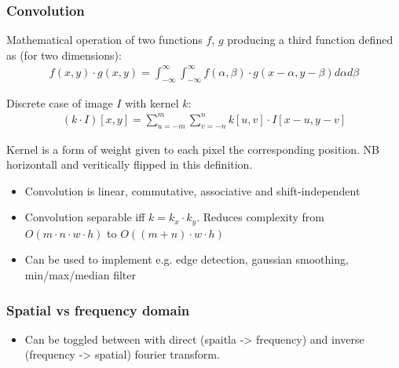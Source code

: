 \subsubsection{Convolution}

Mathematical operation of two functions $f$, $g$ producing a third function
defined as (for two dimensions):
\begin{align*}
		f(x, y) \cdot g(x, y) = \int_{- \infty}^{\infty} \int_{-
		\infty}^{\infty} f(\alpha, \beta) \cdot g(x - \alpha, y - \beta)
		d\alpha d\beta
\end{align*}

Discrete case of image $I$ with kernel $k$:
\begin{align*}
		(k \cdot I)[x, y] = \sum_{u = -m}^{m} \sum_{v = -n}^n k[u, v] \cdot I[x
		- u, y - v]
\end{align*}

Kernel is a form of weight given to each pixel the corresponding position. NB
horizontall and veritically flipped in this definition.

\begin{itemize}
		\item Convolution is linear, commutative, associative and shift-independent
		\item Convolution separable iff $k = k_x \cdot k_y$. Reduces complexity
				from $O(m \cdot n \cdot w \cdot h)$ to $O((m + n) \cdot w \cdot
				h)$

		\item Can be used to implement e.g. edge detection, gaussian smoothing,
				min/max/median filter
\end{itemize}

\subsubsection{Spatial vs frequency domain}

\begin{itemize}
		\item Can be toggled between with direct (spaitla -> frequency) and
				inverse (frequency -> spatial) fourier transform.
\end{itemize}
